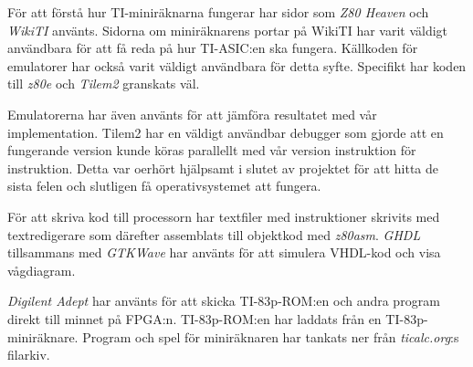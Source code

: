 \documentclass[main.tex]{subfiles}
\begin{document}
För att förstå hur TI-miniräknarna fungerar har sidor som {\it Z80
Heaven}\cite{z80heaven} och {\it WikiTI}\cite{brandonw} använts. Sidorna om
miniräknarens portar på WikiTI har varit väldigt användbara för att få reda på
hur TI-ASIC:en ska fungera. Källkoden för emulatorer har också varit väldigt
användbara för detta syfte. Specifikt har koden till {\it z80e}\cite{z80e} och
{\it Tilem2}\cite{tilem2} granskats väl.

Emulatorerna har även använts för att jämföra resultatet med vår
implementation. Tilem2 har en väldigt användbar debugger som gjorde att en
fungerande version kunde köras parallellt med vår version instruktion för
instruktion. Detta var oerhört hjälpsamt i slutet av projektet för att hitta de
sista felen och slutligen få operativsystemet att fungera.

För att skriva kod till processorn har textfiler med instruktioner skrivits med
textredigerare som därefter assemblats till objektkod med {\it
z80asm}\cite{z80asm}. {\it GHDL}\cite{ghdl} tillsammans med {\it
GTKWave}\cite{gtkwave} har använts för att simulera VHDL-kod och visa
vågdiagram.

{\it Digilent Adept} har använts för att skicka TI-83p-ROM:en och andra program
direkt till minnet på FPGA:n. TI-83p-ROM:en har laddats från en
TI-83p-miniräknare. Program och spel för miniräknaren har tankats ner från {\it
ticalc.org}:s filarkiv\cite{ticalc}.

\end{document}
